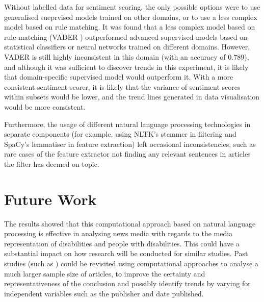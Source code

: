 \documentclass{report}
\begin{document}
Without labelled data for sentiment scoring, the only possible options were to use generalised sueprvised models trained on other domains, or to use a less complex model based on rule matching.
It was found that a less complex model based on rule matching (VADER \cite{VADER}) outperformed advanced supervised models based on statistical classifiers or neural networks trained on different domains.
However, VADER is still highly inconsistent in this domain (with an accuracy of 0.789), and although it was sufficient to discover trends in this experiment, it is likely that domain-specific supervised model would outperform it.
With a more consistent sentiment scorer, it is likely that the variance of sentiment scores within subsets would be lower, and the trend lines generated in data visualisation would be more consistent.

Furthermore, the usage of different natural language processing technologies in separate components (for example, using NLTK's stemmer in filtering and SpaCy's lemmatiser in feature extraction) left occasional inconsistencies, such as rare cases of the feature extractor not finding any relevant sentences in articles the filter has deemed on-topic.

\section{Future Work} \label{Future Work}

The results showed that this computational approach based on natural language processing is effective in analysing news media with regards to the media representation of disabilities and people with disabilities.
This could have a substantial impact on how research will be conducted for similar studies.
Past studies (such as \cite{gold1999media, coverdale2002depictions, jones2009representations, devotta2013representations}) could be revisited using computational approaches to analyse a much larger sample size of articles, to improve the certainty and representativeness of the conclusion and possibly identify trends by varying for independent variables such as the publisher and date published.
\end{document}
